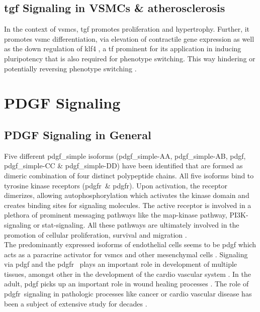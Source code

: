     \subsection{\ac{tgf} Signaling in VSMCs \& atherosclerosis}
    \label{subsec:pdf_signaling}
    In the context of \acp{vsmc}, \ac{tgf} promotes proliferation and hypertrophy. Further, it promotes \ac{vsmc} differentiation, via elevation of contractile gene expression as well as the down regulation of \ac{klf4} \cite{davis-dusenberyDownregulationKruppellikeFactor42011}, a \ac{tf} prominent for its application in inducing pluripotency \cite{takahashiInductionPluripotentStem2007} that is also required for phenotype switching. This way hindering \cite{davis-dusenberyDownregulationKruppellikeFactor42011} or potentially reversing phenotype switching \cite{panSingleCellGenomicsReveals2020}.

\section{PDGF Signaling}
\label{sec:pdgf}
    \subsection{PDGF Signaling in General}
    \label{subsec:pdgf_the_cytokine}
    Five different \ac{pdgf_simple} isoforms (\ac{pdgf_simple}-AA, \ac{pdgf_simple}-AB, \ac{pdgf}, \ac{pdgf_simple}-CC \& \ac{pdgf_simple}-DD) have been identified that are formed as dimeric combination of four distinct polypeptide chains. All five isoforms bind to tyrosine kinase receptors (\ac{pdgfr}\alpha~\& \ac{pdgfr}\beta). Upon activation, the receptor dimerizes, allowing autophosphorylation which activates the kinase domain and creates binding sites for signaling molecules. The active receptor is involved in a plethora of prominent messaging pathways like the \ac{map}-kinase pathway, \ac{PI3K}-signaling or \ac{stat}-signaling. All these pathways are ultimately involved in the promotion of cellular proliferation, survival and migration \cite{chenPlateletderivedGrowthFactors2013, heldinTargetingPDGFSignaling2013, huTargetingPlateletderivedGrowth2015}.\\
    The predominantly expressed isoforms of endothelial cells seems to be \ac{pdgf} \cite{andraeRolePlateletderivedGrowth2008, heldinTargetingPDGFSignaling2013} which acts as a paracrine activator for \acp{vsmc} and other mesenchymal cells \cite{heldinTargetingPDGFSignaling2013}. Signaling via \ac{pdgf} and the \ac{pdgfr}\beta~ plays an important role in development of multiple tissues, amongst other in the development of the cardio vascular system \cite{leveenMiceDeficientPDGF1994}. In the adult, \ac{pdgf} picks up an important role in wound healing processes \cite{robsonPlateletderivedGrowthFactor1992}. The role of \ac{pdgfr}\beta~signaling in pathologic processes like cancer or cardio vascular disease has been a subject of extensive study for decades \cite{heldinTargetingPDGFSignaling2013, rainesPDGFCardiovascularDisease2004}.

